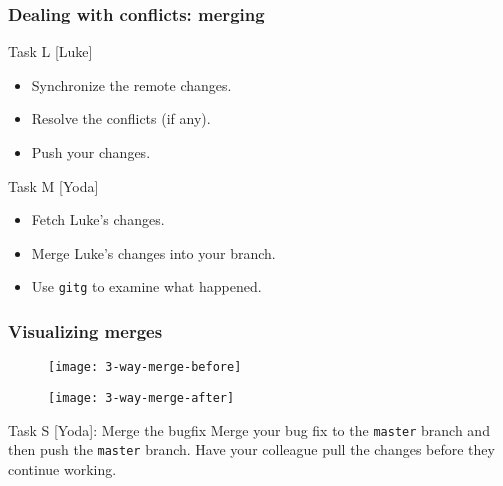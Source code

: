 
\begin{frame}[fragile]
	\frametitle{Dealing with conflicts: merging}

	
	\begin{block}{Task L [Luke]}
	\begin{itemize}
	\item Synchronize the remote changes.
	\item Resolve the conflicts (if any).
	\item Push your changes.
	\end{itemize}
	\end{block}
	
	\begin{block}{Task M [Yoda]}
	\begin{itemize}

	\item Fetch Luke's changes.
	\item Merge Luke's changes into your branch.
	\item Use \texttt{gitg} to examine what happened.

	\end{itemize}
	\end{block}
	

\end{frame}


\begin{frame}[fragile]

\frametitle{Visualizing merges}

\begin{multicols}{2}
	\begin{figure}
		\texttt{[image: 3-way-merge-before]}
	\end{figure}
	\begin{figure}
		\texttt{[image: 3-way-merge-after]}
	\end{figure}
\end{multicols}

	\begin{block}{Task S [Yoda]: Merge the bugfix}
	Merge your bug fix to the \texttt{master} branch and then push the \texttt{master} branch. Have your colleague pull the changes before they continue working.
	\end{block}
\end{frame}

